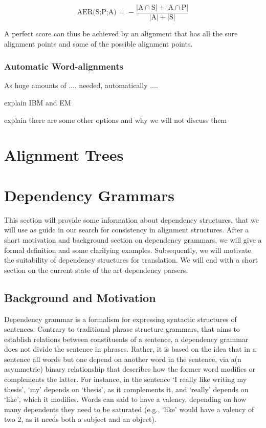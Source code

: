 \documentclass{report}
\theoremstyle{definition}
\theoremstyle{plain}
\begin{document}
$$
\text{AER(S;P;A) = } - \frac{|\text{A}\cap\text{S}| + |\text{A}\cap\text{P}|}{|\text{A}| + |\text{S}|}
$$

A perfect score can thus be achieved by an alignment that has all the sure alignment points and some of the possible alignment points.

\subsubsection{Automatic Word-alignments}



As huge amounts of .... needed, automatically ....


explain IBM and EM

explain there are some other options and why we will not discuss them




\newpage

\section{Alignment Trees}
\label{sec:alignmenttrees}

\newpage

\section{Dependency Grammars}

This section will provide some information about dependency structures, that we will use as guide in our search for consistency in alignment structures. After a short motivation and background section on dependency grammars, we will give a formal definition and some clarifying examples. Subsequently, we will motivate the suitability of dependency structures for translation. We will end with a short section on the current state of the art dependency parsers.

\subsection{Background and Motivation}

Dependency grammar is a formalism for expressing syntactic structures of sentences. Contrary to traditional phrase structure grammars, that aims to establish relations between constituents of a sentence, a dependency grammar does not divide the sentence in phrases. Rather, it is based on the idea that in a sentence all words but one depend on another word in the sentence, via a(n asymmetric) binary relationship that describes how the former word modifies or complements the latter. For instance, in the sentence `I really like writing my thesis', `my' depends on `thesis', as it complements it, and `really' depends on `like', which it modifies. Words can said to have a valency, depending on how many dependents they need to be saturated (e.g., `like' would have a valency of two 2, as it needs both a subject and an object).
\end{document}

